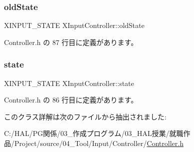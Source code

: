 \mbox{\label{class_x_input_controller_a686db9fe59e21e84e3cfcfbe15b518a2}} 
\subsubsection{\texorpdfstring{old\+State}{oldState}}
{\footnotesize\ttfamily X\+I\+N\+P\+U\+T\+\_\+\+S\+T\+A\+TE X\+Input\+Controller\+::old\+State}



 Controller.\+h の 87 行目に定義があります。

\mbox{\label{class_x_input_controller_a36c0a2bb42c5559460653772a6ec26d1}} 
\subsubsection{\texorpdfstring{state}{state}}
{\footnotesize\ttfamily X\+I\+N\+P\+U\+T\+\_\+\+S\+T\+A\+TE X\+Input\+Controller\+::state}



 Controller.\+h の 86 行目に定義があります。



このクラス詳解は次のファイルから抽出されました\+:\begin{DoxyCompactItemize}
\item 
C\+:/\+H\+A\+L/\+P\+G関係/03\+\_\+作成プログラム/03\+\_\+\+H\+A\+L授業/就職作品/\+Project/source/04\+\_\+\+Tool/\+Input/\+Controller/\mbox{\hyperlink{_controller_8h}{Controller.\+h}}\end{DoxyCompactItemize}

